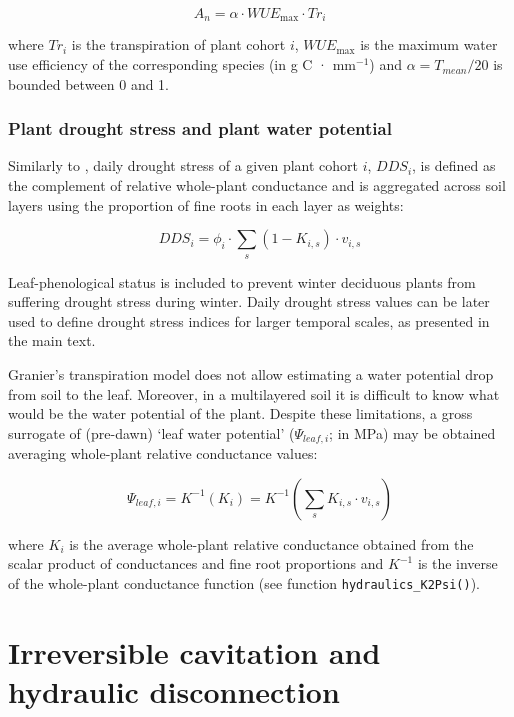 \documentclass[]{book}
\begin{document}
\begin{equation}
A_n = \alpha \cdot WUE_{\max} \cdot Tr_i
\end{equation}

where \(Tr_i\) is the transpiration of plant cohort \(i\),
\(WUE_{\max}\) is the maximum water use efficiency of the corresponding
species (in g C · mm\(^{-1}\)) and \(\alpha = T_{mean}/20\) is bounded
between 0 and 1.

\subsubsection{Plant drought stress and plant water potential}

Similarly to \citet{Mouillot2002}, daily drought stress of a given plant
cohort \(i\), \(DDS_i\), is defined as the complement of relative
whole-plant conductance and is aggregated across soil layers using the
proportion of fine roots in each layer as weights:

\begin{equation}
DDS_i=\phi_i \cdot \sum_{s}{(1-K_{i,s})\cdot v_{i,s}}
\end{equation}

Leaf-phenological status is included to prevent winter deciduous plants
from suffering drought stress during winter. Daily drought stress values
can be later used to define drought stress indices for larger temporal
scales, as presented in the main text.

Granier's transpiration model does not allow estimating a water
potential drop from soil to the leaf. Moreover, in a multilayered soil
it is difficult to know what would be the water potential of the plant.
Despite these limitations, a gross surrogate of (pre-dawn) `leaf water
potential' (\(\Psi_{leaf,i}\); in MPa) may be obtained averaging
whole-plant relative conductance values:

\begin{equation}
\Psi_{leaf,i}=K^{-1}(K_i) = K^{-1}\left(\sum_{s}{K_{i,s}\cdot v_{i,s}}\right)
\end{equation}

where \(K_i\) is the average whole-plant relative conductance obtained
from the scalar product of conductances and fine root proportions and
\(K^{-1}\) is the inverse of the whole-plant conductance function (see
function \texttt{hydraulics\_K2Psi()}).

\section{Irreversible cavitation and hydraulic
disconnection}\label{irreversible-cavitation-and-hydraulic-disconnection}
\end{document}
